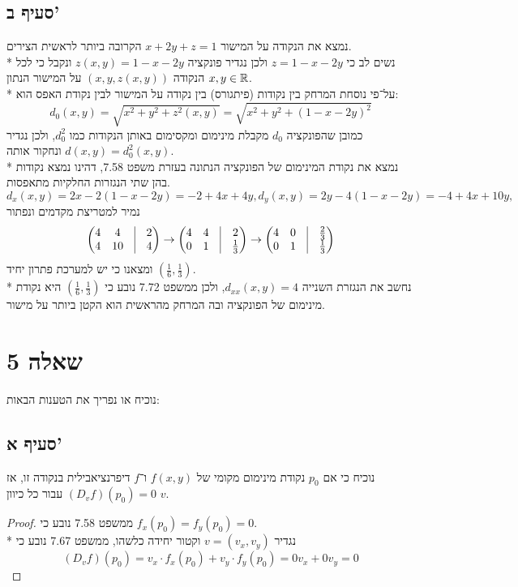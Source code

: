 \subsection{סעיף ב'}
נמצא את הנקודה על המישור $x + 2y + z = 1$ הקרובה ביותר לראשית הצירים. \\*
נשים לב כי $z = 1 - x - 2y$ ולכן נגדיר פונקציה $z(x, y) = 1 - x - 2y$ ונקבל כי לכל $x, y \in \mathbb{R}$ הנקודה $(x, y, z(x, y))$ על המישור הנתון. \\*
על־פי נוסחת המרחק בין נקודות (פיתגורס) בין נקודה על המישור לבין נקודת האפס הוא:
\[
	d_0(x, y)
	= \sqrt{x^2 + y^2 + z^2(x, y)}
	= \sqrt{x^2 + y^2 + {(1 - x - 2y)}^2}
\]
כמובן שהפונקציה $d_0$ מקבלת מינימום ומקסימום באותן הנקודות כמו $d_0^2$, ולכן נגדיר $d(x, y) = d_0^2(x, y)$ ונחקור אותה. \\*
נמצא את נקודת המינימום של הפונקציה הנתונה בעזרת משפט 7.58, דהינו נמצא נקודות בהן שתי הנגזרות החלקיות מתאפסות.
\[
	d_x(x, y) = 2x - 2(1 - x - 2y) = -2 + 4x + 4y,
	d_y(x, y) = 2y - 4(1 - x - 2y) = -4 + 4x + 10y,
\]
נמיר למטריצת מקדמים ונפתור
\[
	\begin{pmatrix}
		4 & 4 & \vline & 2 \\
		4 & 10 & \vline & 4
	\end{pmatrix}
	\rightarrow
	\begin{pmatrix}
		4 & 4 & \vline & 2 \\
		0 & 1 & \vline & \frac{1}{3}
	\end{pmatrix}
	\rightarrow
	\begin{pmatrix}
		4 & 0 & \vline & \frac{2}{3} \\
		0 & 1 & \vline & \frac{1}{3}
	\end{pmatrix}
\]
ומצאנו כי יש למערכת פתרון יחיד $(\frac{1}{6}, \frac{1}{3})$. \\*
נחשב את הנגזרת השנייה $d_{xx}(x, y) = 4$, ולכן ממשפט 7.72 נובע כי
$(\frac{1}{6}, \frac{1}{3})$ היא נקודת מינימום של הפונקציה ובה המרחק מהראשית הוא הקטן ביותר על מישור.

\section{שאלה 5}
נוכיח או נפריך את הטענות הבאות:

\subsection{סעיף א'}
נוכיח כי אם $p_0$ נקודת מינימום מקומי של $f(x, y)$ ו־$f$ דיפרנציאבילית בנקודה זו, אז $(D_v f)(p_0) = 0$ עבור כל כיוון $v$.
\begin{proof}
	 ממשפט 7.58 נובע כי $f_x(p_0) = f_y(p_0) = 0$. \\*
	 נגדיר $v = (v_x, v_y)$ וקטור יחידה כלשהו, ממשפט 7.67 נובע כי
	 \[
		 (D_v f)(p_0) = v_x \cdot f_x(p_0) + v_y \cdot f_y(p_0) = 0v_x + 0v_y = 0
	 \]
\end{proof}

